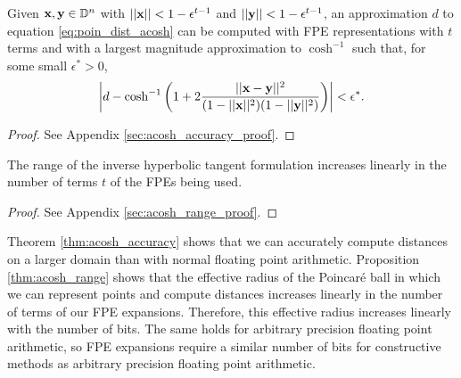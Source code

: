 \begin{theorem}\label{thm:acosh_accuracy}
    Given $\mathbf{x}, \mathbf{y} \in \mathbb{D}^n$ with $||\mathbf{x}|| < 1 - \epsilon^{t - 1}$ and $||\mathbf{y}|| < 1 - \epsilon^{t - 1}$, an approximation $d$ to equation \ref{eq:poin_dist_acosh} can be computed with FPE representations with $t$ terms and with a largest magnitude approximation to $\cosh^{-1}$ such that, for some small $\epsilon^* > 0$,
    \begin{equation}
        \bigg|d - \cosh^{-1} \bigg( 1 + 2 \frac{||\mathbf{x} - \mathbf{y}||^2}{(1 - ||\mathbf{x}||^2) (1 - ||\mathbf{y}||^2)} \bigg)\bigg| < \epsilon^*.
    \end{equation}
\end{theorem}
\vspace{-0.4cm}
\begin{proof}
    See Appendix \ref{sec:acosh_accuracy_proof}.
\end{proof}
\vspace{-0.2cm}
\begin{proposition}\label{thm:acosh_range}
    The range of the inverse hyperbolic tangent formulation increases linearly in the number of terms $t$ of the FPEs being used.
\end{proposition}
\vspace{-0.4cm}
\begin{proof}
    See Appendix \ref{sec:acosh_range_proof}.
\end{proof}
\vspace{-0.2cm}
Theorem \ref{thm:acosh_accuracy} shows that we can accurately compute distances on a larger domain than with normal floating point arithmetic. Proposition \ref{thm:acosh_range} shows that the effective radius of the Poincaré ball in which we can represent points and compute distances increases linearly in the number of terms of our FPE expansions. Therefore, this effective radius increases linearly with the number of bits. The same holds for arbitrary precision floating point arithmetic, so FPE expansions require a similar number of bits for constructive methods as arbitrary precision floating point arithmetic.

